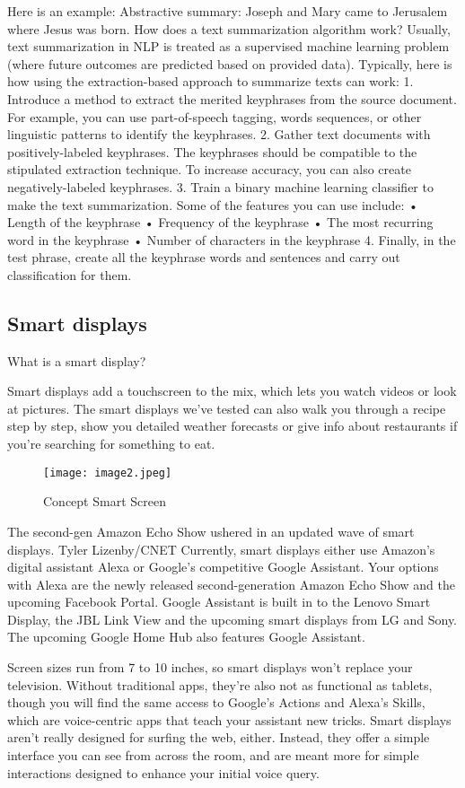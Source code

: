 \documentclass[12pt,a4paper]{article}
\begin{document}
Here is an example:
Abstractive summary: Joseph and Mary came to Jerusalem where Jesus was born.
How does a text summarization algorithm work?
Usually, text summarization in NLP is treated as a supervised machine learning problem (where future outcomes are predicted based on provided data).
Typically, here is how using the extraction-based approach to summarize texts can work:
1. Introduce a method to extract the merited keyphrases from the source document. For example, you can use part-of-speech tagging, words sequences, or other linguistic patterns to identify the keyphrases.
2. Gather text documents with positively-labeled keyphrases. The keyphrases should be compatible to the stipulated extraction technique. To increase accuracy, you can also create negatively-labeled keyphrases.
3. Train a binary machine learning classifier to make the text summarization. Some of the features you can use include:
•	Length of the keyphrase
•	Frequency of the keyphrase
•	The most recurring word in the keyphrase
•	Number of characters in the keyphrase
4. Finally, in the test phrase, create all the keyphrase words and sentences and carry out classification for them.


\newpage
\begin{center}
\section{Smart displays}
\end{center}
\par What is a smart display?
\par Smart displays add a touchscreen to the mix, which lets you watch videos or look at pictures. The smart displays we've tested can also walk you through a recipe step by step, show you detailed weather forecasts or give info about restaurants if you're searching for something to eat.
 
\begin{figure}[h]
	\centering
	\texttt{[image: image2.jpeg]}
	\caption{Concept Smart Screen}
\end{figure} 
 
\par The second-gen Amazon Echo Show ushered in an updated wave of smart displays.
Tyler Lizenby/CNET
Currently, smart displays either use Amazon's digital assistant Alexa or Google's competitive Google Assistant. Your options with Alexa are the newly released second-generation Amazon Echo Show and the upcoming Facebook Portal. Google Assistant is built in to the Lenovo Smart Display, the JBL Link View and the upcoming smart displays from LG and Sony. The upcoming Google Home Hub also features Google Assistant.
\par Screen sizes run from 7 to 10 inches, so smart displays won't replace your television. Without traditional apps, they're also not as functional as tablets, though you will find the same access to Google's Actions and Alexa's Skills, which are voice-centric apps that teach your assistant new tricks.
Smart displays aren't really designed for surfing the web, either. Instead, they offer a simple interface you can see from across the room, and are meant more for simple interactions designed to enhance your initial voice query. 
\end{document}

